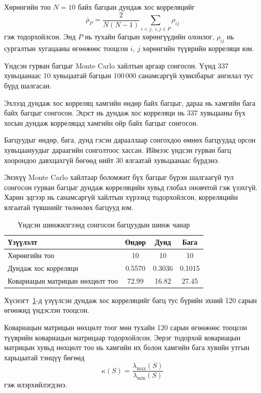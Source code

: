 Хөрөнгийн тоо $N=10$ байх багцын дундаж хос
корреляцийг
\[
\bar{\rho}_{P}
=
\frac{2}{N(N-1)}
\sum_{i<j,\;i,j\in P}
\rho_{ij}
\]
гэж тодорхойлсон. Энд $P$ нь тухайн багцын
хөрөнгүүдийн олонлог, $\rho_{ij}$ нь сургалтын
хугацааны өгөөжөөс тооцсон $i$, $j$ хөрөнгийн
түүврийн корреляци юм.

Үндсэн гурван багцыг Monte Carlo хайлтын аргаар
сонгосон. Үүнд 337 хувьцаанаас 10 хувьцаатай
багцын 100\,000 санамсаргүй хувилбарыг ангилал
тус бүрд шалгасан.

Эхлээд дундаж хос корреляц хамгийн өндөр байх
багцыг, дараа нь хамгийн бага байх багцыг
сонгосон. Эцэст нь дундаж хос корреляци нь
337 хувьцааны бүх хосын дундаж корреляцад
хамгийн ойр байх багцыг сонгосон.

Багцуудыг өндөр, бага, дунд гэсэн дарааллаар
сонгохдоо өмнөх багцуудад орсон хувьцаануудыг
дараагийн сонголтоос хассан. Иймээс үндсэн
гурван багц хоорондоо давхцахгүй бөгөөд
нийт 30 ялгаатай хувьцаанаас бүрдэнэ.

Энэхүү Monte Carlo хайлтаар боломжит бүх багцыг бүрэн шалгаагүй тул сонгосон гурван багцыг дундаж корреляцийн хувьд глобал оновчтой гэж үзэхгүй. Харин эдгээр нь санамсаргүй хайлтын хүрээнд тодорхойлсон, корреляцийн ялгаатай түвшнийг төлөөлөх багцууд юм.

\begin{table}[htbp]
	\centering
	\caption{Үндсэн шинжилгээнд сонгосон
		багцуудын шинж чанар}
	\label{tab:portfolio_selection}
	\small
	\begin{tabular}{lccc}
		\hline
		Үзүүлэлт
		& Өндөр
		& Дунд
		& Бага\\
		\hline
		Хөрөнгийн тоо
		& 10 & 10 & 10\\
		Дундаж хос корреляци
		& 0.5570 & 0.3036 & 0.1015\\
		Ковариацын матрицын нөхцөлт тоо
		& 72.99 & 16.82 & 27.45\\
		\hline
	\end{tabular}
\end{table}

Хүснэгт~\ref{tab:portfolio_selection}-д
үзүүлсэн дундаж хос корреляцийг багц тус бүрийн
эхний 120 сарын өгөөжид үндэслэн тооцсон.

Ковариацын матрицын нөхцөлт тоог мөн тухайн
120 сарын өгөөжөөс тооцсон түүврийн
ковариацын матрицаар тодорхойлсон.
Эерэг тодорхой ковариацын матрицын хувьд
нөхцөлт тоо нь хамгийн их болон хамгийн бага
хувийн утгын харьцаатай тэнцүү бөгөөд
\[
\kappa(S)
=
\frac{\lambda_{\max}(S)}
{\lambda_{\min}(S)}
\]
гэж илэрхийлэгдэнэ.

